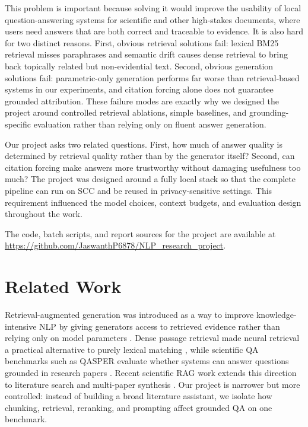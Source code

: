 \documentclass[11pt]{article}
\begin{document}
This problem is important because solving it would improve the usability of local question-answering systems for scientific and other high-stakes documents, where users need answers that are both correct and traceable to evidence. It is also hard for two distinct reasons. First, obvious retrieval solutions fail: lexical BM25 retrieval misses paraphrases and semantic drift causes dense retrieval to bring back topically related but non-evidential text. Second, obvious generation solutions fail: parametric-only generation performs far worse than retrieval-based systems in our experiments, and citation forcing alone does not guarantee grounded attribution. These failure modes are exactly why we designed the project around controlled retrieval ablations, simple baselines, and grounding-specific evaluation rather than relying only on fluent answer generation.

Our project asks two related questions. First, how much of answer quality is determined by retrieval quality rather than by the generator itself? Second, can citation forcing make answers more trustworthy without damaging usefulness too much? The project was designed around a fully local stack so that the complete pipeline can run on SCC and be reused in privacy-sensitive settings. This requirement influenced the model choices, context budgets, and evaluation design throughout the work.

The code, batch scripts, and report sources for the project are available at \url{https://github.com/JaswanthP6878/NLP_research_project}.

\section{Related Work}

Retrieval-augmented generation was introduced as a way to improve knowledge-intensive NLP by giving generators access to retrieved evidence rather than relying only on model parameters \citep{lewis2020rag}. Dense passage retrieval made neural retrieval a practical alternative to purely lexical matching \citep{karpukhin2020dpr}, while scientific QA benchmarks such as QASPER evaluate whether systems can answer questions grounded in research papers \citep{dasigi2021qasper}. Recent scientific RAG work extends this direction to literature search and multi-paper synthesis \citep{ajith2024litsearch,lala2023paperqa}. Our project is narrower but more controlled: instead of building a broad literature assistant, we isolate how chunking, retrieval, reranking, and prompting affect grounded QA on one benchmark.
\end{document}
